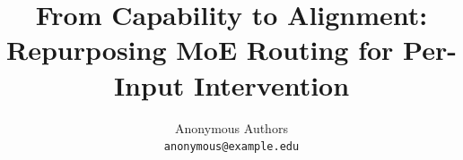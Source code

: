 \documentclass{article}
\title{From Capability to Alignment: Repurposing MoE Routing for Per-Input Intervention}
\author{%
  Anonymous Authors \\
  \texttt{anonymous@example.edu}
}
\begin{document}
\maketitle

\begin{abstract}

\end{abstract}












\end{document}

